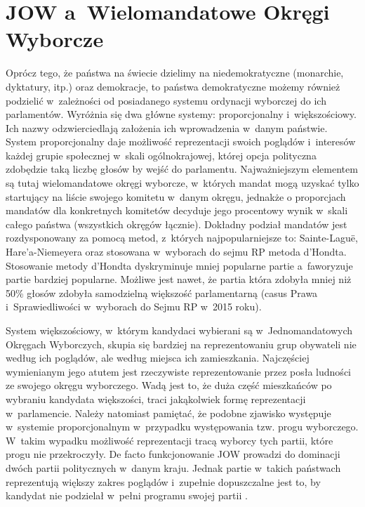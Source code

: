 \section{JOW a~Wielomandatowe Okręgi Wyborcze}

Oprócz tego, że państwa na świecie dzielimy na niedemokratyczne (monarchie, dyktatury, itp.) oraz demokracje, to państwa demokratyczne możemy również podzielić w~zależności od posiadanego systemu ordynacji wyborczej do ich parlamentów. Wyróżnia się dwa główne systemy: proporcjonalny i~większościowy. Ich nazwy odzwierciedlają założenia ich wprowadzenia w~danym państwie. System proporcjonalny daje możliwość reprezentacji swoich poglądów i~interesów każdej grupie społecznej w~skali ogólnokrajowej, której opcja polityczna zdobędzie taką liczbę głosów by wejść do parlamentu. Najważniejszym elementem są tutaj wielomandatowe okręgi wyborcze, w~których mandat mogą uzyskać tylko startujący na liście swojego komitetu w~danym okręgu, jednakże o proporcjach mandatów dla konkretnych komitetów decyduje jego procentowy wynik w~skali całego państwa (wszystkich okręgów łącznie). Dokładny podział mandatów jest rozdysponowany za pomocą metod, z~których najpopularniejsze to: Sainte-Laguë, Hare’a-Niemeyera oraz stosowana w~wyborach do sejmu RP metoda d'Hondta. Stosowanie metody d'Hondta dyskryminuje mniej popularne partie a~faworyzuje partie bardziej popularne. Możliwe jest nawet, że partia która zdobyła mniej niż 50\% głosów zdobyła samodzielną większość parlamentarną (casus Prawa i~Sprawiedliwości w~wyborach do Sejmu RP w~2015 roku).

System większościowy, w~którym kandydaci wybierani są w~Jednomandatowych Okręgach Wyborczych, skupia się bardziej na reprezentowaniu grup obywateli nie według ich poglądów, ale według miejsca ich zamieszkania. Najczęściej wymienianym jego atutem jest rzeczywiste reprezentowanie przez posła ludności ze swojego okręgu wyborczego. Wadą jest to, że duża część mieszkańców po wybraniu kandydata większości, traci jakąkolwiek formę reprezentacji w~parlamencie. Należy natomiast pamiętać, że podobne zjawisko występuje w~systemie proporcjonalnym w~przypadku występowania tzw. progu wyborczego. W~takim wypadku możliwość reprezentacji tracą wyborcy tych partii, które progu nie przekroczyły. De facto funkcjonowanie JOW prowadzi do dominacji dwóch partii politycznych w~danym kraju. Jednak partie w~takich państwach reprezentują większy zakres poglądów i~zupełnie dopuszczalne jest to, by kandydat nie podzielał w~pełni programu swojej partii \cite{Urbańczyk}.

